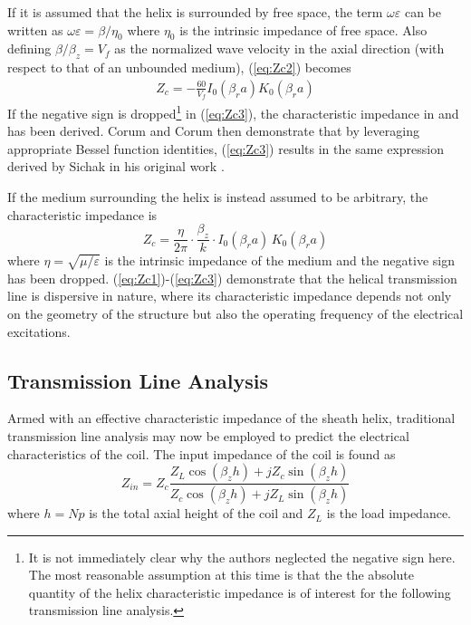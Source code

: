 If it is assumed that the helix is surrounded by free space, the term $\omega\varepsilon$ can be written as $\omega\varepsilon = \beta/\eta_0$ where $\eta_0$ is the intrinsic impedance of free space. Also defining $\beta/\beta_z=V_f$ as the normalized wave velocity in the axial direction (with respect to that of an unbounded medium), (\ref{eq:Zc2}) becomes 
\begin{equation}\label{eq:Zc3}
	\begin{split}
		Z_c = -\frac{60}{V_f}
		I_0(\beta_r a) K_0(\beta_r a)
	\end{split}
\end{equation}
If the negative sign is dropped\footnote{It is not immediately clear why the authors neglected the negative sign here. The most reasonable assumption at this time is that the the absolute quantity of the helix characteristic impedance is of interest for the following transmission line analysis.} in (\ref{eq:Zc3}), the characteristic impedance in \cite{corum1} and \cite{corum2} has been derived. Corum and Corum then demonstrate that by leveraging appropriate Bessel function identities, (\ref{eq:Zc3}) results in the same expression derived by Sichak in his original work \cite{corum1}.

If the medium surrounding the helix is instead assumed to be arbitrary, the characteristic impedance is
\begin{equation}
	Z_c = \frac{\eta}{2\pi} \cdot \frac{\beta_z}{k} \cdot I_0(\beta_r a) \, K_0(\beta_r a)
\end{equation}
where $\eta=\sqrt{\mu/\varepsilon}$ is the intrinsic impedance of the medium and the negative sign has been dropped. (\ref{eq:Zc1})-(\ref{eq:Zc3}) demonstrate that the helical transmission line is dispersive in nature, where its characteristic impedance depends not only on the geometry of the structure but also the operating frequency of the electrical excitations. 

\subsection{Transmission Line Analysis}\label{subsec:transmit}
Armed with an effective characteristic impedance of the sheath helix, traditional transmission line analysis may now be employed to predict the electrical characteristics of the coil. The input impedance of the coil is found as
\begin{equation}\label{eq:inputZ}
	Z_{in} = Z_c \frac{Z_L \cos(\beta_z h) + j Z_c \sin(\beta_z h)}{Z_c \cos(\beta_z h) + j Z_L \sin(\beta_z h)}
\end{equation}
where $h=Np$ is the total axial height of the coil and $Z_L$ is the load impedance.

